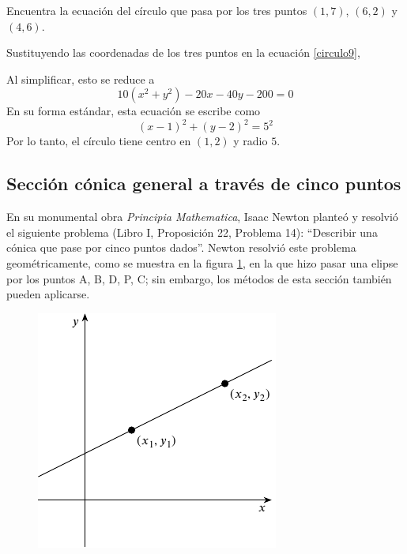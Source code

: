 \begin{examplebox}{}{}
    Encuentra la ecuación del círculo que pasa por los tres puntos $(1, 7)$, $(6, 2)$ y $(4, 6)$.

    \tcblower
    \solucion Sustituyendo las coordenadas de los tres puntos en la ecuación \eqref{circulo9},
    \begin{matrizn}
    \end{matrizn}
    Al simplificar, esto se reduce a
    $$10\left(x^2 + y^2\right) - 20x - 40y - 200 = 0$$
    En su forma estándar, esta ecuación se escribe como
    $$(x - 1)^2 + (y - 2)^2 = 5^2$$
    Por lo tanto, el círculo tiene centro en $(1, 2)$ y radio $5$.
\end{examplebox}

\subsection*{Sección cónica general a través de cinco puntos}

En su monumental obra \emph{Principia Mathematica}, Isaac Newton planteó y resolvió el siguiente problema (Libro I, Proposición 22, Problema 14): “Describir una cónica que pase por cinco puntos dados”. Newton resolvió este problema geométricamente, como se muestra en la figura \ref{fig:conica5puntosN}, en la que hizo pasar una elipse por los puntos A, B, D, P, C; sin embargo, los métodos de esta sección también pueden aplicarse.
\begin{figure}[h!]
    \centering
    \includegraphics[page=3]{Images/Capitulo8/figurasC8.pdf}
    \caption{}\label{fig:conica5puntosN}
\end{figure}

